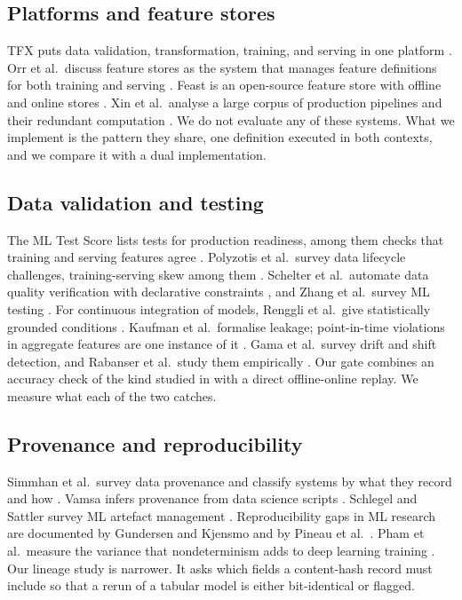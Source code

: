 \documentclass[journal]{IEEEtran}
\begin{document}
\subsection{Platforms and feature stores}
TFX puts data validation, transformation, training, and serving in one platform \cite{baylor2017tfx}. Orr et al.\ discuss feature stores as the system that manages feature definitions for both training and serving \cite{orr2021featurestores}. Feast is an open-source feature store with offline and online stores \cite{feast}. Xin et al.\ analyse a large corpus of production pipelines and their redundant computation \cite{xin2021production}. We do not evaluate any of these systems. What we implement is the pattern they share, one definition executed in both contexts, and we compare it with a dual implementation.

\subsection{Data validation and testing}
The ML Test Score lists tests for production readiness, among them checks that training and serving features agree \cite{breck2017mltestscore}. Polyzotis et al.\ survey data lifecycle challenges, training-serving skew among them \cite{polyzotis2018lifecycle}. Schelter et al.\ automate data quality verification with declarative constraints \cite{schelter2018dataquality}, and Zhang et al.\ survey ML testing \cite{zhang2022mltesting}. For continuous integration of models, Renggli et al.\ give statistically grounded conditions \cite{renggli2019easemlci}. Kaufman et al.\ formalise leakage; point-in-time violations in aggregate features are one instance of it \cite{kaufman2012leakage}. Gama et al.\ survey drift and shift detection, and Rabanser et al.\ study them empirically \cite{gama2014drift,rabanser2019failing}. Our gate combines an accuracy check of the kind studied in \cite{renggli2019easemlci} with a direct offline-online replay. We measure what each of the two catches.

\subsection{Provenance and reproducibility}
Simmhan et al.\ survey data provenance and classify systems by what they record and how \cite{simmhan2005provenance}. Vamsa infers provenance from data science scripts \cite{namaki2020vamsa}. Schlegel and Sattler survey ML artefact management \cite{schlegel2022artifacts}. Reproducibility gaps in ML research are documented by Gundersen and Kjensmo and by Pineau et al.\ \cite{gundersen2018reproducibility,pineau2020reproducibility}. Pham et al.\ measure the variance that nondeterminism adds to deep learning training \cite{pham2020variance}. Our lineage study is narrower. It asks which fields a content-hash record must include so that a rerun of a tabular model is either bit-identical or flagged.
\end{document}

